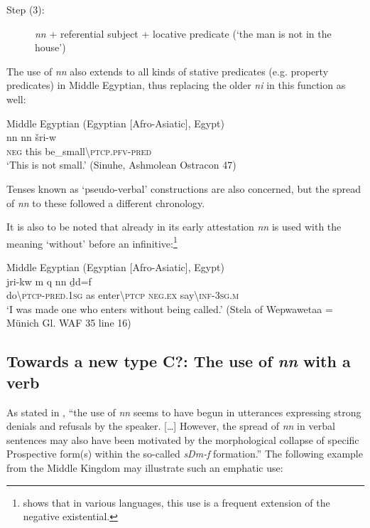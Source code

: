 \documentclass[output=paper,draft,draftmode,colorlinks,citecolor=brown]{langscibook}
\begin{document}
\begin{description}
\item[Step (3):] \textit{nn} + referential subject + locative predicate (‘the man is not in the house’) 
\end{description}
 
The use of \textit{nn} also extends to all kinds of stative predicates (e.g. property predicates) in Middle Egyptian, thus replacing the older \textit{ni} in this function as well: 

\ea Middle Egyptian (Egyptian [Afro-Asiatic], Egypt) \label{ex:AE32}\\ 
    \gll nn nn šri-w \\
    \textsc{neg} this be\_small\textbackslash\textsc{ptcp.pfv-pred}\\ 
    \glt ‘This is not small.’ (Sinuhe, Ashmolean Ostracon 47)
\z 
 
Tenses known as ‘pseudo-verbal’ constructions are also concerned, but the spread of \textit{nn} to these followed a different chronology. 
 
It is also to be noted that already in its early attestation \textit{nn} is used with the meaning ‘without’ before an infinitive:\footnote{\citet[118]{Veselinova2013} shows that in various languages, this use is a frequent extension of the negative existential.}

\ea Middle Egyptian (Egyptian [Afro-Asiatic], Egypt) \label{ex:AE33}\\ 
    \gll jri-kw m {\ꜥ}q nn ḏd=f \\
    do\textbackslash\textsc{ptcp-pred.1sg} as enter\textbackslash\textsc{ptcp} \textsc{neg.ex} say\textbackslash\textsc{inf-3sg.m}\\ 
    \glt ‘I was made one who enters without being called.’ (Stela of Wepwawetaa = Münich Gl. WAF 35 line 16) 
\z 

\subsection{Towards a new type C?: The use of \textit{nn} with a verb}\label{s:AE2-4}

As stated in \citet[258]{Loprieno-etal2017}, ``the use of \textit{nn} seems to have begun in utterances expressing strong denials and refusals by the speaker. […] However, the spread of \textit{nn} in verbal sentences may also have been motivated by the morphological collapse of specific Prospective form(s) within the so-called \textit{sDm-f} formation.''
The following example from the Middle Kingdom may illustrate such an emphatic use: 
 
\end{document}
